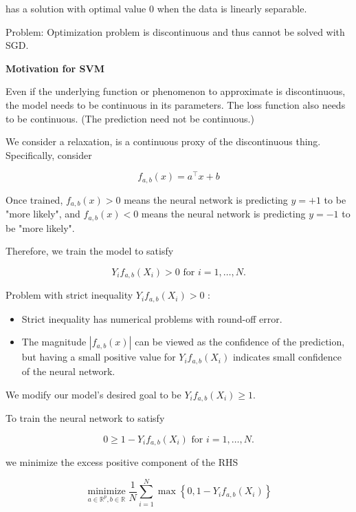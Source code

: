 \documentclass{report}
\begin{document}
has a solution with optimal value 0 when the data is linearly separable.

Problem: Optimization problem is discontinuous and thus cannot be solved with SGD.

\par\noindent\textcolor{gray}{\hdashrule{\textwidth}{0.4pt}{1pt 2pt}}

\textbf{Motivation for SVM}

Even if the underlying function or phenomenon to approximate is discontinuous, the model needs to be continuous in its parameters. The loss function also needs to be continuous. (The prediction need not be continuous.)

We consider a relaxation, is a continuous proxy of the discontinuous thing. Specifically, consider

$$
f_{a, b}(x)=a^{\top} x+b
$$

Once trained, $f_{a, b}(x)>0$ means the neural network is predicting $y=+1$ to be "more likely", and $f_{a, b}(x)<0$ means the neural network is predicting $y=-1$ to be "more likely".

Therefore, we train the model to satisfy

$$
Y_{i} f_{a, b}\left(X_{i}\right)>0 \text { for } i=1, \ldots, N .
$$

Problem with strict inequality $Y_{i} f_{a, b}\left(X_{i}\right)>0$ :

\begin{itemize}
    \item Strict inequality has numerical problems with round-off error.
    \item The magnitude $\left|f_{a, b}(x)\right|$ can be viewed as the confidence of the prediction, but having a small positive value for $Y_{i} f_{a, b}\left(X_{i}\right)$ indicates small confidence of the neural network.
\end{itemize}

We modify our model's desired goal to be $Y_{i} f_{a, b}\left(X_{i}\right) \geq 1$.

To train the neural network to satisfy

$$
0 \geq 1-Y_{i} f_{a, b}\left(X_{i}\right) \text { for } i=1, \ldots, N .
$$

we minimize the excess positive component of the RHS

$$
\underset{a \in \mathbb{R}^{p}, b \in \mathbb{R}}{\operatorname{minimize}} \frac{1}{N} \sum_{i=1}^{N} \max \left\{0,1-Y_{i} f_{a, b}\left(X_{i}\right)\right\}
$$
\end{document}
